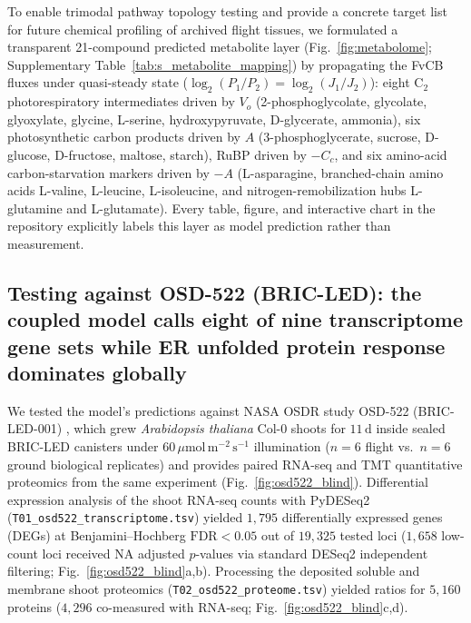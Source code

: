 \documentclass[final,5p,times,twocolumn,numbers,sort&compress]{elsarticle}
\newcommand{\ums}{\ensuremath{\mu\mathrm{mol\,m^{-2}\,s^{-1}}}}
\begin{document}
To enable trimodal pathway topology testing and provide a concrete target list for future chemical profiling of archived flight tissues, we formulated a transparent 21-compound predicted metabolite layer (Fig.~\ref{fig:metabolome}; Supplementary Table~\ref{tab:s_metabolite_mapping}) by propagating the FvCB fluxes under quasi-steady state ($\log_2(P_1/P_2) = \log_2(J_1/J_2)$): eight $\mathrm{C_2}$ photorespiratory intermediates driven by $V_o$ (2-phosphoglycolate, glycolate, glyoxylate, glycine, L-serine, hydroxypyruvate, D-glycerate, ammonia), six photosynthetic carbon products driven by $A$ (3-phosphoglycerate, sucrose, D-glucose, D-fructose, maltose, starch), RuBP driven by $-C_c$, and six amino-acid carbon-starvation markers driven by $-A$ (L-asparagine, branched-chain amino acids L-valine, L-leucine, L-isoleucine, and nitrogen-remobilization hubs L-glutamine and L-glutamate). Every table, figure, and interactive chart in the repository explicitly labels this layer as model prediction rather than measurement.

\subsection{Testing against OSD-522 (BRIC-LED): the coupled model calls eight of nine transcriptome gene sets while ER unfolded protein response dominates globally}\label{sec:osd522}

We tested the model's predictions against NASA OSDR study OSD-522 (BRIC-LED-001) \citep{osd522}, which grew \textit{Arabidopsis thaliana} Col-0 shoots for $11\,\mathrm{d}$ inside sealed BRIC-LED canisters under $60\,\ums$ illumination ($n = 6$ flight vs.\ $n = 6$ ground biological replicates) and provides paired RNA-seq and TMT quantitative proteomics from the same experiment (Fig.~\ref{fig:osd522_blind}). Differential expression analysis of the shoot RNA-seq counts with PyDESeq2 \citep{pydeseq2} (\texttt{T01\_osd522\_transcriptome.tsv}) yielded $1{,}795$ differentially expressed genes (DEGs) at Benjamini--Hochberg $\mathrm{FDR}<0.05$ out of $19{,}325$ tested loci ($1{,}658$ low-count loci received $\mathrm{NA}$ adjusted $p$-values via standard DESeq2 independent filtering; Fig.~\ref{fig:osd522_blind}a,b). Processing the deposited soluble and membrane shoot proteomics (\texttt{T02\_osd522\_proteome.tsv}) yielded ratios for $5{,}160$ proteins ($4{,}296$ co-measured with RNA-seq; Fig.~\ref{fig:osd522_blind}c,d).
\end{document}
